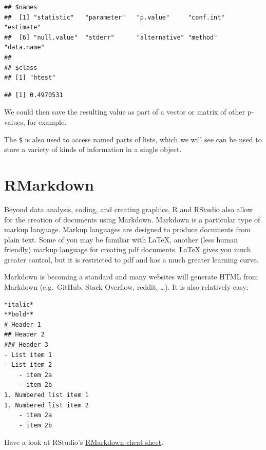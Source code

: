 \documentclass[
]{book}
\newenvironment{Shaded}{\begin{snugshade}}{\end{snugshade}}
\newcommand{\NormalTok}[1]{#1}
\newcommand{\SpecialCharTok}[1]{\textcolor[rgb]{0.00,0.00,0.00}{#1}}
\begin{document}
\begin{verbatim}
## $names
##  [1] "statistic"   "parameter"   "p.value"     "conf.int"    "estimate"   
##  [6] "null.value"  "stderr"      "alternative" "method"      "data.name"  
## 
## $class
## [1] "htest"
\end{verbatim}

\begin{Shaded}
\end{Shaded}

\begin{verbatim}
## [1] 0.4970531
\end{verbatim}

We could then save the resulting value as part of a vector or matrix of other p-values, for example.

The \texttt{\$} is also used to access named parts of lists, which we will see can be used to store a variety of kinds of information in a single object.

\hypertarget{rmarkdown}{%
\section{RMarkdown}\label{rmarkdown}}

Beyond data analysis, coding, and creating graphics, R and RStudio also allow for the creation of documents using Markdown. Markdown is a particular type of markup language. Markup languages are designed to produce documents from plain text. Some of you may be familiar with LaTeX, another (less human friendly) markup language for creating pdf documents. LaTeX gives you much greater control, but it is restricted to pdf and has a much greater learning curve.

Markdown is becoming a standard and many websites will generate HTML from Markdown (e.g.~GitHub, Stack Overflow, reddit, \ldots). It is also relatively easy:

\begin{verbatim}
*italic*
**bold**
# Header 1
## Header 2
### Header 3
- List item 1
- List item 2
    - item 2a
    - item 2b
1. Numbered list item 1
1. Numbered list item 2
    - item 2a
    - item 2b
\end{verbatim}

Have a look at RStudio's \href{https://www.rstudio.com/resources/cheatsheets/}{RMarkdown cheat sheet}.
\end{document}
